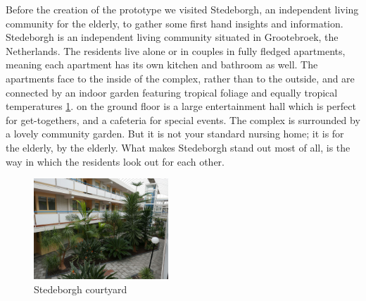 \documentclass{below-ext}
\begin{document}
Before the creation of the prototype we visited Stedeborgh, an independent living community for the elderly, to gather some first hand insights and information. Stedeborgh is an independent living community situated in Grootebroek, the Netherlands. The residents live alone or in couples in fully fledged apartments, meaning each apartment has its own kitchen and bathroom as well. The apartments face to the inside of the complex, rather than to the outside, and are connected by an indoor garden featuring tropical foliage and equally tropical temperatures \ref{fig:stedeborgh}. on the ground floor is a large entertainment hall which is perfect for get-togethers, and a cafeteria for special events. The complex is surrounded by a lovely community garden. But it is not your standard nursing home; it is for the elderly, by the elderly. What makes Stedeborgh stand out most of all, is the way in which the residents look out for each other.\\
\vspace{0.2cm}
\begin{figure}
\centering
\includegraphics[width=0.45\textwidth]{stedeborgh}
\caption{Stedeborgh courtyard}
\label{fig:stedeborgh}
\end{figure}
\end{document}
